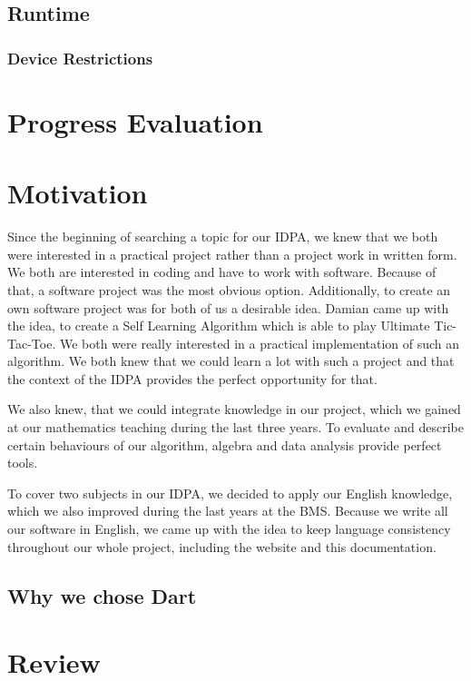 \subsection{ Runtime } 

\subsubsection{ Device Restrictions}


\section{Progress Evaluation}


\section{Motivation}
Since the beginning of searching a topic for our IDPA, we knew that we both were interested in a practical project rather than a  project work in written form. We both are interested in coding and have to work with software. Because of that, a software project was the most obvious option. Additionally, to create an own software project was for both of us a desirable idea.
Damian came up with the idea, to create a Self Learning Algorithm which is able to play Ultimate Tic-Tac-Toe. We both were really interested in a practical implementation of such an algorithm. We both knew that we could learn a lot with such a project and that the context of the IDPA provides the perfect opportunity for that. 

We also knew, that we could integrate knowledge in our project, which we gained at our mathematics teaching during the last three years. To evaluate and describe certain behaviours of our algorithm, algebra and data analysis provide perfect tools.

To cover two subjects in our IDPA, we decided to apply our English knowledge, which we also improved during the last years at the BMS. Because we write all our software in English, we came up with the idea to keep language consistency throughout our whole project, including the website and this documentation.

\subsection{Why we chose Dart}



\section{Review}
